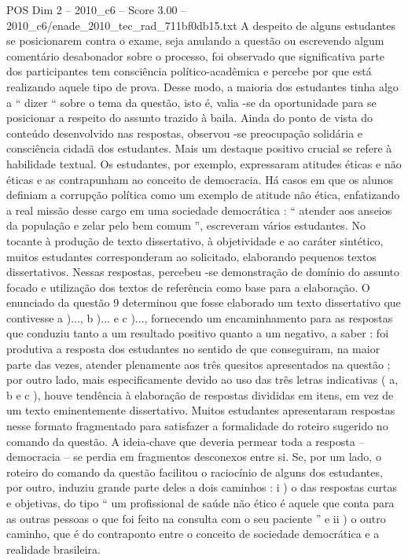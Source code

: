 \begin{textsample}{POS Dim 2 – 2010\_c6 – Score 3.00 – 2010\_c6/enade\_2010\_tec\_rad\_711bf0db15.txt}
A despeito de alguns estudantes se posicionarem contra o exame, seja anulando a questão ou escrevendo algum comentário desabonador sobre o processo, foi observado que significativa parte dos participantes tem consciência político-acadêmica e percebe por que está realizando aquele tipo de prova.
Desse modo, a maioria dos estudantes tinha algo a “ dizer “ sobre o tema da questão, isto é, valia -se da oportunidade para se posicionar a respeito do assunto trazido à baila.
Ainda do ponto de vista do conteúdo desenvolvido nas respostas, observou -se preocupação solidária e consciência cidadã dos estudantes.
Mais um destaque positivo crucial se refere à habilidade textual.
Os estudantes, por exemplo, expressaram atitudes éticas e não éticas e as contrapunham ao conceito de democracia.
Há casos em que os alunos definiam a corrupção política como um exemplo de atitude não ética, enfatizando a real missão desse cargo em uma sociedade democrática : “ atender aos anseios da população e zelar pelo bem comum ”, escreveram vários estudantes.
No tocante à produção de texto dissertativo, à objetividade e ao caráter sintético, muitos estudantes corresponderam ao solicitado, elaborando pequenos textos dissertativos.
Nessas respostas, percebeu -se demonstração de domínio do assunto focado e utilização dos textos de referência como base para a elaboração.
O enunciado da questão 9 determinou que fosse elaborado um texto dissertativo que contivesse a )..., b )... e c )..., fornecendo um encaminhamento para as respostas que conduziu tanto a um resultado positivo quanto a um negativo, a saber : foi produtiva a resposta dos estudantes no sentido de que conseguiram, na maior parte das vezes, atender plenamente aos três quesitos apresentados na questão ; por outro lado, mais especificamente devido ao uso das três letras indicativas ( a, b e c ), houve tendência à elaboração de respostas divididas em itens, em vez de um texto eminentemente dissertativo.
Muitos estudantes apresentaram respostas nesse formato fragmentado para satisfazer a formalidade do roteiro sugerido no comando da questão.
A ideia-chave que deveria permear toda a resposta – democracia – se perdia em fragmentos desconexos entre si.
Se, por um lado, o roteiro do comando da questão facilitou o raciocínio de alguns dos estudantes, por outro, induziu grande parte deles a dois caminhos : i ) o das respostas curtas e objetivas, do tipo “ um profissional de saúde não ético é aquele que conta para as outras pessoas o que foi feito na consulta com o seu paciente ” e ii ) o outro caminho, que é do contraponto entre o conceito de sociedade democrática e a realidade brasileira.

\end{textsample}
